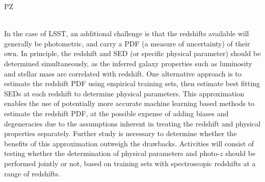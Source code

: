 {\begin{tasklist}{PZ}
\begin{task}
{~\\
In the case of LSST, an additional challenge is that the redshifts available will generally be photometric, and carry a PDF (a measure of uncertainty) of their own. In principle, the redshift and SED (or specific physical parameter) should be determined simultaneously, as the inferred galaxy properties such as luminosity and stellar mass are correlated with redshift.  One alternative approach is to estimate the redshift PDF using empirical training sets, then estimate best fitting SEDs at each redshift to determine physical parameters.  This approximation enables the use of potentially more accurate machine learning based methods to estimate the redshift PDF, at the possible expense of adding biases and degeneracies due to the assumptions inherent in treating the redshift and physical properties separately.  Further study is necessary to determine whether the benefits of this approximation outweigh the drawbacks.
Activities will consist of testing whether the determination of physical parameters and photo-$z$ should be performed jointly or not, based on training sets with spectroscopic redshifts at a range of redshifts.
}
~\\
\end{task}


\end{tasklist}}
